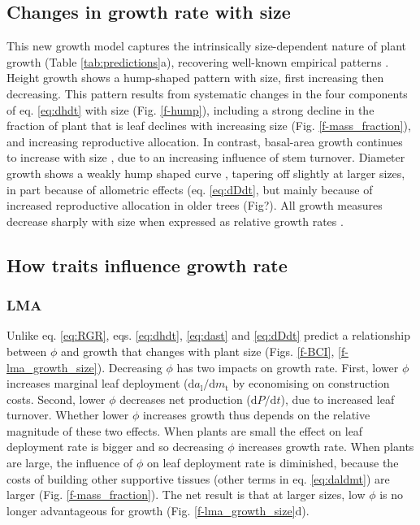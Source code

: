 \documentclass[12pt, a4paper]{article}
\begin{document}
\subsection{Changes in growth rate with size}\label{changes-in-growth-rate-with-size}

This new growth model captures the intrinsically size-dependent nature
of plant growth (Table \ref{tab:predictions}a), recovering well-known
empirical patterns \citep{sillett-2010, king-2011}. Height growth shows a hump-shaped pattern
with size, first increasing then decreasing. This pattern results from
systematic changes in the four components of eq. \ref{eq:dhdt} with size
(Fig. \ref{f-hump}), including a strong decline in the fraction of plant
that is leaf declines with increasing size (Fig. \ref{f-mass_fraction}),
and increasing reproductive allocation. In contrast, basal-area growth
continues to increase with size \citep{sillett-2010,
@stephenson-2014}, due to an increasing influence of stem
turnover. Diameter growth shows a weakly hump shaped
curve \citep{herault-2011}, tapering off slightly at larger
sizes, in part because of allometric effects (eq. \ref{eq:dDdt}, but
mainly because of increased reproductive allocation in older trees
(Fig?). All growth measures decrease sharply with size when expressed as
relative growth rates \citep{iida-2014}.


\subsection{How traits influence growth rate}\label{how-traits-influence-growth-rate}

\subsubsection{LMA}\label{lma}

Unlike eq. \ref{eq:RGR}, eqs. \ref{eq:dhdt}, \ref{eq:dast} and
\ref{eq:dDdt} predict a relationship between $\phi$ and growth that
changes with plant size (Figs. \ref{f-BCI}, \ref{f-lma_growth_size}).
Decreasing $\phi$ has two impacts on growth rate. First, lower
$\phi$ increases marginal leaf deployment
($\textrm{d}a_\textrm{l} / \textrm{d}m_\textrm{t}$ by economising on
construction costs. Second, lower $\phi$ decreases net production
($\textrm{d}P / \textrm{d}t$), due to increased leaf turnover. Whether
lower $\phi$ increases growth thus depends on the relative magnitude
of these two effects. When plants are small the effect on leaf
deployment rate is bigger and so decreasing $\phi$ increases growth
rate. When plants are large, the influence of $\phi$ on leaf
deployment rate is diminished, because the costs of building other
supportive tissues (other terms in eq. \ref{eq:daldmt}) are larger (Fig.
\ref{f-mass_fraction}). The net result is that at larger sizes, low
$\phi$ is no longer advantageous for growth (Fig.
\ref{f-lma_growth_size}d).
\end{document}
